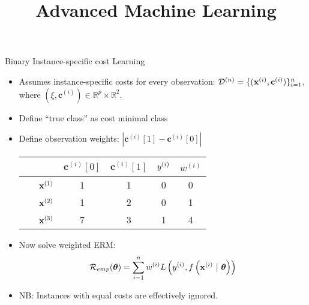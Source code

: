 \documentclass[11pt,compress,t,notes=noshow, xcolor=table]{beamer}
\title{Advanced Machine Learning}
\date{}
\newcommand{\cv}{\mathbf{c}}    %
\begin{document}



\sloppy





\begin{vbframe}{Binary Instance-specific cost Learning}
    \begin{itemize}
        \item Assumes instance-specific costs for every observation:  $\D^{(n)} = \{(\xi, \cv^{(i)})\}_{i=1}^n$, where $(\xi, \cv^{(i)}) \in \mathbb{R}^p \times \mathbb{R}^2$.
        \vspace{5pt}

        \item Define ``true class'' as cost minimal class
        \vspace{5pt}
        
        \item Define observation weights: $|\cv^{(i)}[1] - \cv^{(i)}[0]|$
        \vspace{5pt}

        \begin{center}
                            \begin{tabular}{cc|cccc}\
        			& & $\cv^{(i)}[0]$ & $\cv^{(i)}[1]$ & $y^{(i)}$ & $w^{(i)}$ \\
        			\hline & $\mathbf{x}^{(1)}$ & 1 & 1 & 0 & 0\\
        			& $\mathbf{x}^{(2)}$ & 1 & 2 & 0 & 1\\
        			& $\mathbf{x}^{(3)}$ & 7 & 3 & 1 & 4\\

                \end{tabular}
        \end{center}
                \vspace{5pt}

        \item Now solve weighted ERM:
        \begin{equation*}
            \mathcal{R}_{emp}(\boldsymbol{\theta}) = \sum_{i=1}^{n}w^{(i)} L\left(y^{(i)}, f\left(\mathbf{x}^{(i)} ~|~ \bm{\theta}\right)\right)
        \end{equation*}
        
        \item NB: Instances with equal costs are effectively ignored.
        \end{itemize}
            
\end{vbframe}
\end{document}
